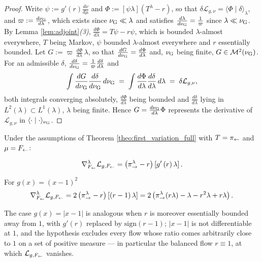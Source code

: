 \begin{proof}
Write $\psi:=g'(r)\frac{d\nu}{d\mu}$ and $\Phi:=\left[\psi\lambda\right](T^\lambda-r)$, so that $\delta\mathcal L_{g,\nu}=\langle\Phi\mid\delta\rangle_\lambda$, and $\varpi:=\frac{d\nu_{\mathrm{G}}}{d\lambda}$, which exists since $\nu_{\mathrm{G}}\ll\lambda$ and satisfies $\frac{d\lambda}{d\nu_{\mathrm{G}}}=\frac1\varpi$ since $\lambda\ll\nu_{\mathrm{G}}$. By Lemma \ref{lem:adjoint}\emph{(3)}, $\frac{d\Phi}{d\lambda}=T\psi-r\psi$, which is bounded $\lambda$-almost everywhere, $T$ being Markov, $\psi$ bounded $\lambda$-almost everywhere and $r$ essentially bounded. Let $G:=\varpi\,\frac{d\Phi}{d\lambda}\,\lambda$, so that $\frac{dG}{d\nu_{\mathrm{G}}}=\frac{d\Phi}{d\lambda}$ and, $\nu_{\mathrm{G}}$ being finite, $G\in\mathcal M^2(\nu_{\mathrm{G}})$. For an admissible $\delta$, $\frac{d\delta}{d\nu_{\mathrm{G}}}=\frac1\varpi\frac{d\delta}{d\lambda}$ and
\begin{equation}
    \int\frac{dG}{d\nu_{\mathrm{G}}}\frac{d\delta}{d\nu_{\mathrm{G}}}\,d\nu_{\mathrm{G}} \;=\; \int\frac{d\Phi}{d\lambda}\frac{d\delta}{d\lambda}\,d\lambda \;=\; \delta\mathcal L_{g,\nu},
\end{equation}
both integrals converging absolutely, $\frac{d\Phi}{d\lambda}$ being bounded and $\frac{d\delta}{d\lambda}$ lying in $L^2(\lambda)\subset L^1(\lambda)$, $\lambda$ being finite. Hence $G=\frac{d\nu_{\mathrm{G}}}{d\lambda}\Phi$ represents the derivative of $\mathcal L_{g,\nu}$ in $\langle\cdot\mid\cdot\rangle_{\nu_{\mathrm{G}}}$.
\end{proof}

\begin{corollary}[FM gradients]\label{cor:gradient_formulas} Under the assumptions of Theorem \ref{theo:first_variation_full} with $T=\pi_{\leftarrow}$ and $\mu = F_{\leftarrow}$:

 \begin{equation}
      \nabla_{F_{\leftarrow}}^{\lambda} \mathcal L_{g,F_{\leftarrow}} = \left(\pi_{\rightarrow}^\lambda-r\right)\left[g'\left(r\right)\lambda \right].
     \end{equation}

     For $g(x)=(x-1)^2$
      \begin{equation}
      \nabla_{F_{\leftarrow}}^{\lambda} \mathcal L_{g,F_{\leftarrow}} = 2\left(\pi_{\rightarrow}^\lambda-r\right)
      \left[\left(r-1\right)\lambda \right] = 2 \left(\pi_{\rightarrow}^\lambda (r\lambda)- \lambda-r^2\lambda+r\lambda\right).
     \end{equation}

     The case $g(x)=|x-1|$ is analogous when $r$ is moreover essentially bounded away from $1$, with $g'(r)$ replaced by $\mathrm{sign}(r-1)$; $|x-1|$ is not differentiable at $1$, and the hypothesis excludes every flow whose ratio comes arbitrarily close to $1$ on a set of positive measure --- in particular the balanced flow $r\equiv1$, at which $\mathcal L_{g,F_{\leftarrow}}$ vanishes.
\end{corollary}

